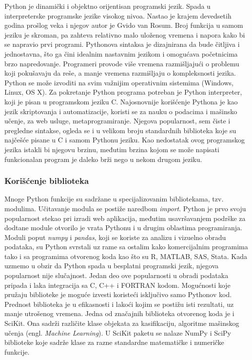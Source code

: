 \documentclass[12pt]{article}
\begin{document}
Python je dinamički i objektno orijentisan programski jezik. Spada u interpreterske programske jezike visokog nivoa. Nastao je krajem devedsetih godina prošlog veka i njegov autor je Gvido van Rosum.  Broj funkcija u samom jeziku je skroman, pa zahteva relativno malo uloženog vremena i napora kako bi se napravio prvi programi. Pythonova sintaksa je dizajnirana da bude čitljiva i jednostavna, što ga čini idealnim nastavnim jezikom i omogućava početnicima brzo napredovanje. Programeri provode više vremena razmišljajući o problemu koji pokušavaju da reše, a manje vremena razmišljaju o kompleksnosti jezika. Python se može izvoditi na svim važnijim operativnim sistemima (Windows, Linux, OS X). Za pokretanje Python programa potreban je Python interpreter, koji je pisan u programskom jeziku C. 
Najosnovnije korišćenje Pythona je kao jezik skriptovanja i automatizacije, koristi se za nauku o podacima i mašinsko učenje, za web usluge, metaprogramiranje. Njegova popularnost, sem čiste i pregledne sintakse, ogleda se i u velikom broju standardnih biblioteka koje su najčešće pisane u C i samom Pythonu jeziku. Kao nedostatak ovog programskog jezika istakli bi njegovu brzinu, međutim brzina kojom se može napisati funkcionalan program je daleko brži nego u nekom drugom jeziku.  


\subsubsection{Korišćenje biblioteka}
Mnoge Python funkcije su sadržane u specijalizovanim bibliotekama, tzv. modulima. Učitavanje modula se postiže naredbom \textsl{import}. Python je prvo svoju popularnost stekao pri izradi web aplikacija, međutim usavršavanjem podrške za dodtane module otvorilo je vrata Pythonu i u drugim oblastima programiranja. Moduli poput \textsl{numpy} i \textsl{pandas}, koji se koriste za analizu i vizuelno obradu podataka, su Python svrstali uz rame sa ostalim kako komercijalnim programima tako i sa programima otvorenog koda kao što su R, MATLAB, SAS, Stata. Kada uzmemo u obzir da Python spada u besplatni programski jezik, njegova popularnost nije slučajnost. Jedan deo ove popularnosti u obradi podataka pripada i laka integracija sa C, C++ i FORTRAN kodom.  
Mogućnosti koje pružaju biblioteke je moguće izvesti koristeći isključivo samo Pythonov kod. Prednost biblioteka je u efikasnosti i lakoći kojim se postižu isti rezultati, uz manje utrošenog vremena. Jedna od značajnih biblioteka otvorenog koda je i SciKit. Ona sadrži različite klase objekata za kasifikaciju, algoritme mašinskog učenja (engl. \textsl{Machine Learning}). U SciKit paketu se nalaze  NumPy i SciPy biblioteke koje sadrže klase za razne standardne matematičke i numeričke funkcije. 
\end{document}
